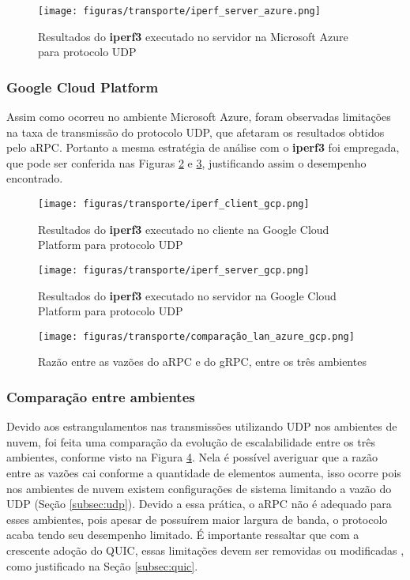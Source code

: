 \begin{figure}[!ht]
    \centering
    \caption{Resultados do \textbf{iperf3} executado no servidor na Microsoft Azure para protocolo UDP}
    \texttt{[image: figuras/transporte/iperf\_server\_azure.png]} 
    \label{fig:iperf_server_azure}
\end{figure}

\subsubsection{Google Cloud Platform}

Assim como ocorreu no ambiente Microsoft Azure, foram observadas limitações na taxa de transmissão do protocolo UDP, que afetaram os resultados obtidos pelo aRPC. Portanto a mesma estratégia de análise com o \textbf{iperf3} foi empregada, que pode ser conferida nas Figuras \ref{fig:iperf_client_gcp} e \ref{fig:iperf_server_gcp}, justificando assim o desempenho encontrado.

\begin{figure}[ht]
    \centering
    \caption{Resultados do \textbf{iperf3} executado no cliente na Google Cloud Platform para protocolo UDP}
    \texttt{[image: figuras/transporte/iperf\_client\_gcp.png]} 
    \label{fig:iperf_client_gcp}
\end{figure}

\begin{figure}[!ht]
    \centering
    \caption{Resultados do \textbf{iperf3} executado no servidor na Google Cloud Platform para protocolo UDP}
    \texttt{[image: figuras/transporte/iperf\_server\_gcp.png]} 
    \label{fig:iperf_server_gcp}
\end{figure}

\begin{figure}[ht]
    \centering
    \caption{Razão entre as vazões do aRPC e do gRPC, entre os três ambientes}
    \texttt{[image: figuras/transporte/comparação\_lan\_azure\_gcp.png]} 
    \label{fig:comparação_lan_azure_gcp}
\end{figure}

\subsubsection{Comparação entre ambientes}

Devido aos estrangulamentos nas transmissões utilizando UDP nos ambientes de nuvem, foi feita uma comparação da evolução de escalabilidade entre os três ambientes, conforme visto na Figura \ref{fig:comparação_lan_azure_gcp}. Nela é possível averiguar que a razão entre as vazões cai conforme a quantidade de elementos aumenta, isso ocorre pois nos ambientes de nuvem existem configurações de sistema limitando a vazão do UDP (Seção \ref{subsec:udp}). Devido a essa prática, o aRPC não é adequado para esses ambientes, pois apesar de possuírem maior largura de banda, o protocolo acaba tendo seu desempenho limitado. É importante ressaltar que com a crescente adoção do QUIC, essas limitações devem ser removidas ou modificadas \cite{rossow2014amplification}, como justificado na Seção \ref{subsec:quic}.

